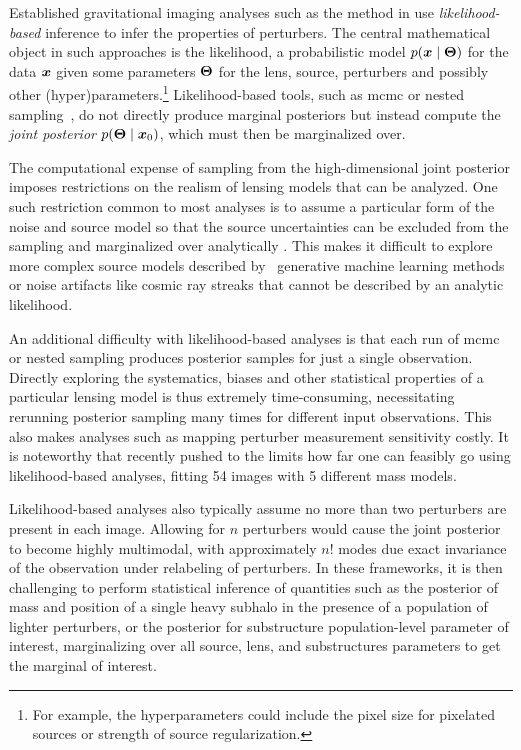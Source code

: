Established gravitational imaging analyses such as the method in \cite{Vegetti:2008eg,Hezaveh:2016ltk} use \emph{likelihood-based} inference to infer the properties of perturbers. The central mathematical object in such approaches is the likelihood, a probabilistic model $p(\bm{x} \mid \bm{\Theta})$ for the data $\bm{x}$ given some parameters $\bm{\Theta}$ for the lens, source, perturbers and possibly other (hyper)parameters.\footnote{For example, the hyperparameters could include the pixel size for pixelated sources or strength of source regularization.}   
Likelihood-based tools, such as \gls*{mcmc} or nested sampling~\citep{Skilling:2004pqw}, do not directly produce marginal posteriors but instead compute the \emph{joint posterior} $p(\bm{\Theta} \mid \bm{x}_0)$, which must then be marginalized over. 

The computational expense of sampling from the high-dimensional joint posterior imposes restrictions on the realism of lensing models that can be analyzed. One such restriction common to most analyses is to  assume a particular form of the noise and source model so that the source uncertainties can be excluded from the sampling and marginalized over analytically \citep{Hezaveh:2016ltk,Vegetti:2008eg,Vegetti:2009cz,Vegetti:2010wa,Vegetti:2012mc}. This makes it difficult to explore more complex source models described by \eg~generative machine learning methods or noise artifacts like cosmic ray streaks that cannot be described by an analytic likelihood.

An additional difficulty with likelihood-based analyses is that each run of \gls*{mcmc} or nested sampling produces posterior samples for just a single observation. Directly exploring the systematics, biases and other statistical properties of a particular lensing model is thus extremely time-consuming, necessitating rerunning posterior sampling many times for different input observations. This also makes analyses such as mapping perturber measurement sensitivity costly. It is noteworthy that recently \cite{Nightingale:2022bhh} pushed to the limits how far one can feasibly go using likelihood-based analyses, fitting 54 images with 5 different mass models.

Likelihood-based analyses also typically assume no more than two perturbers are present in each image. Allowing for $n$ perturbers would cause the joint posterior to become highly multimodal, with approximately $n!$ modes due exact invariance of the observation under relabeling of perturbers. In these frameworks, it is then challenging to perform statistical inference of quantities such as the posterior of mass and position of a single heavy subhalo in the presence of a population of lighter perturbers, or the posterior for substructure population-level parameter of interest, marginalizing over all source, lens, and substructures parameters to get the marginal of interest.

